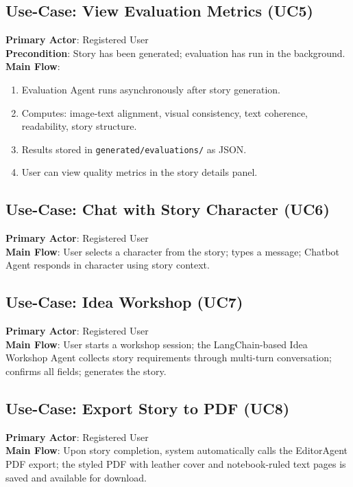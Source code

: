 \subsection{Use-Case: View Evaluation Metrics (UC5)}
\textbf{Primary Actor}: Registered User \\
\textbf{Precondition}: Story has been generated; evaluation has run in the background. \\
\textbf{Main Flow}:
\begin{enumerate}
    \item Evaluation Agent runs asynchronously after story generation.
    \item Computes: image-text alignment, visual consistency, text coherence, readability, story structure.
    \item Results stored in \texttt{generated/evaluations/} as JSON.
    \item User can view quality metrics in the story details panel.
\end{enumerate}

\subsection{Use-Case: Chat with Story Character (UC6)}
\textbf{Primary Actor}: Registered User \\
\textbf{Main Flow}: User selects a character from the story; types a message; Chatbot Agent responds in character using story context.

\subsection{Use-Case: Idea Workshop (UC7)}
\textbf{Primary Actor}: Registered User \\
\textbf{Main Flow}: User starts a workshop session; the LangChain-based Idea Workshop Agent collects story requirements through multi-turn conversation; confirms all fields; generates the story.

\subsection{Use-Case: Export Story to PDF (UC8)}
\textbf{Primary Actor}: Registered User \\
\textbf{Main Flow}: Upon story completion, system automatically calls the EditorAgent PDF export; the styled PDF with leather cover and notebook-ruled text pages is saved and available for download.


